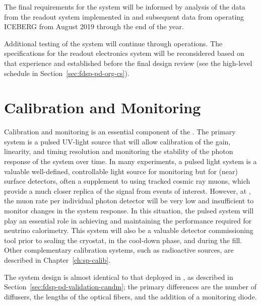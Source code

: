 The final requirements for the system will be informed by analysis of the data from the readout system implemented in  and subsequent data from operating ICEBERG from August 2019 through the end of the year.

Additional testing of the system will continue through  operations. The specifications for the readout electronics system will be reconsidered based on that experience and established before the  final design review (see the high-level schedule in Section~\ref{sec:fdsp-pd-org-cs}). 


\section{Calibration and Monitoring}
\label{sec:fdsp-pd-CandM}

Calibration and monitoring is an essential component of the .
The primary system is a pulsed UV-light source that will allow calibration of the  gain, linearity, and timing resolution and monitoring the stability of the photon response of the system over time.
In many experiments, a pulsed light system is a valuable well-defined, controllable light source for monitoring but for (near) surface detectors, often a supplement to using tracked cosmic ray muons, which provide a much closer replica of the signal from events of interest. 
However, at , the muon rate per individual photon detector will be very low and insufficient to monitor changes in the system response. In this situation, the pulsed system will play an essential role in achieving and maintaining the  performance required for neutrino calorimetry. 
This system will also be a valuable detector commissioning tool prior to sealing the cryostat, in the cool-down phase, and during the  fill.
Other complementary calibration systems, such as radioactive sources, are described in Chapter~\ref{ch:sp-calib}. 

The system design is almost identical to that deployed in , as described in Section~\ref{sec:fdsp-pd-validation-candm}; the primary differences are the number of diffusers, the lengths of the optical fibers, and the addition of a monitoring diode.

